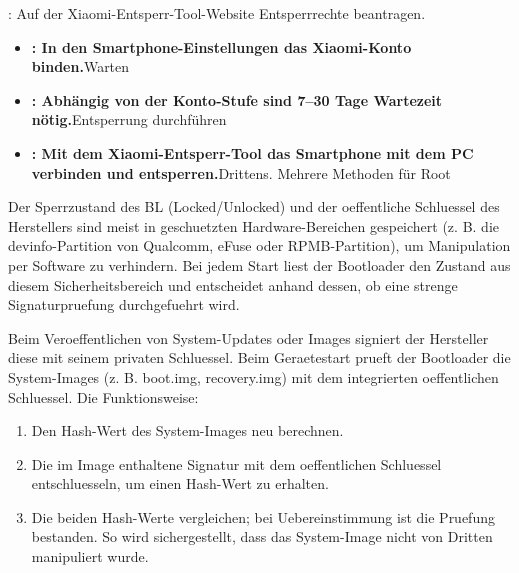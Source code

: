 


: Auf der Xiaomi-Entsperr-Tool-Website Entsperrrechte beantragen.


\begin{itemize}
  \item \textbf{: In den Smartphone-Einstellungen das Xiaomi-Konto binden.}Warten
  \item \textbf{: Abhängig von der Konto-Stufe sind 7–30 Tage Wartezeit nötig.}Entsperrung durchführen
  \item \textbf{: Mit dem Xiaomi-Entsperr-Tool das Smartphone mit dem PC verbinden und entsperren.}Drittens. Mehrere Methoden für Root
\end{itemize}


Der Sperrzustand des BL (Locked/Unlocked) und der oeffentliche Schluessel des Herstellers sind meist in geschuetzten Hardware-Bereichen gespeichert (z. B. die devinfo-Partition von Qualcomm, eFuse oder RPMB-Partition), um Manipulation per Software zu verhindern. Bei jedem Start liest der Bootloader den Zustand aus diesem Sicherheitsbereich und entscheidet anhand dessen, ob eine strenge Signaturpruefung durchgefuehrt wird.


Beim Veroeffentlichen von System-Updates oder Images signiert der Hersteller diese mit seinem privaten Schluessel. Beim Geraetestart prueft der Bootloader die System-Images (z. B. boot.img, recovery.img) mit dem integrierten oeffentlichen Schluessel. Die Funktionsweise:

\begin{enumerate}
  \item Den Hash-Wert des System-Images neu berechnen.
  \item Die im Image enthaltene Signatur mit dem oeffentlichen Schluessel entschluesseln, um einen Hash-Wert zu erhalten.
  \item Die beiden Hash-Werte vergleichen; bei Uebereinstimmung ist die Pruefung bestanden. So wird sichergestellt, dass das System-Image nicht von Dritten manipuliert wurde.
\end{enumerate}

